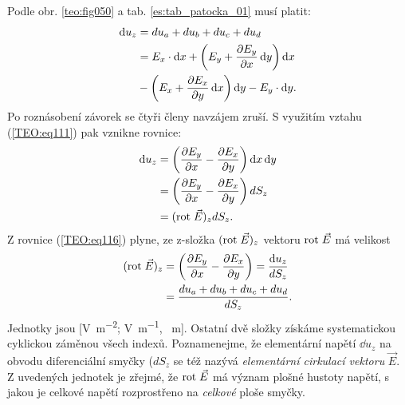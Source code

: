         Podle obr. \ref{teo:fig050} a tab. \ref{es:tab_patocka_01} musí platit:
        \begin{align*}
          \mathop{}\!\mathrm{d}u_z &= du_a + du_b + du_c + du_d                                            \\ 
               &= E_x\cdot\mathop{}\!\mathrm{d}x + \left(E_y + \dfrac{\partial E_y}{\partial x}\mathop{}\!\mathrm{d}y\right)\mathop{}\!\mathrm{d}x            \\
               &- \left(E_x+\dfrac{\partial E_x}{\partial y}\mathop{}\!\mathrm{d}x\right)\mathop{}\!\mathrm{d}y-E_y\cdot \mathop{}\!\mathrm{d}y. 
        \end{align*}
        Po roznásobení závorek se čtyři členy navzájem zruší. S využitím vztahu 
        (\ref{TEO:eq111}) pak vznikne rovnice:
        \begin{align}
          \mathop{}\!\mathrm{d}u_z
            &= \left(\dfrac{\partial E_y}{\partial x} - \dfrac{\partial E_x}{\partial y}\right)\mathop{}\!\mathrm{d}x\mathop{}\!\mathrm{d}y            \nonumber \\
            &= \left(\dfrac{\partial E_y}{\partial x} - \dfrac{\partial E_x}{\partial y}\right)dS_z                    \nonumber \\
            &= (\mathrm{rot}\;\vec{E})_z dS_z.                                                 \label{TEO:eq116}
        \end{align}
        Z rovnice (\ref{TEO:eq116}) plyne, ze z-složka \((\mathrm{rot}\;\vec{E})_z\) vektoru \(\mathrm{rot}\;\vec{E}\) 
        má velikost
        \begin{align}
          (\mathrm{rot}\;\vec{E})_z &= \left(\dfrac{\partial E_y}{\partial x} - \dfrac{\partial E_x}{\partial y}\right)        
                       = \frac{\mathop{}\!\mathrm{d}u_z}{dS_z}                         \nonumber  \\
                      &= \frac{du_a + du_b + du_c + du_d}{dS_z}.       \label{TEO:eq117}
        \end{align}
        Jednotky jsou [\si{\V\per\square\m}; \si{\V\per\m}, \si{\per\m}]. Ostatní dvě složky získáme
        systematickou cyklickou záměnou všech indexů. Poznamenejme, že elementární napětí
        \(\dd{u_z}\) na obvodu diferenciální smyčky (\(dS_z\) se též nazývá \emph{elementární
        cirkulací vektoru} \(\vec{E}\). Z uvedených jednotek je zřejmé, že \(\mathrm{rot}\;\vec{E}\) má význam
        plošné hustoty napětí, s jakou je celkové napětí rozprostřeno na \emph{celkové} ploše
        smyčky.
      
